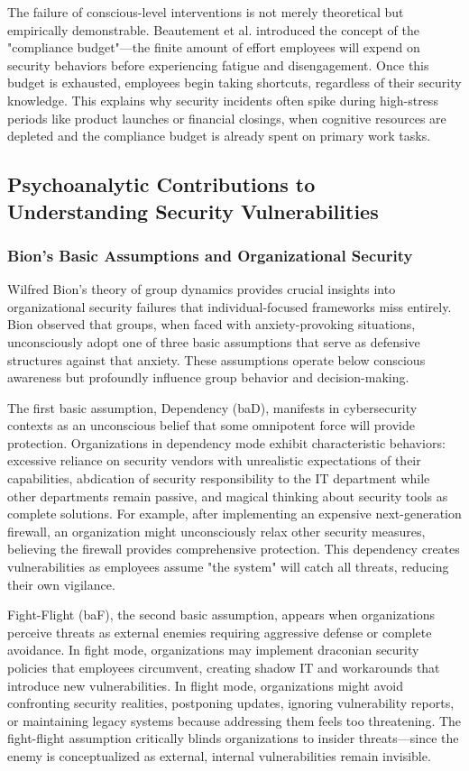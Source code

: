 \documentclass[manuscript,screen,review]{acmart}
\begin{document}
The failure of conscious-level interventions is not merely theoretical but empirically demonstrable. Beautement et al.\cite{beautement2008} introduced the concept of the "compliance budget"—the finite amount of effort employees will expend on security behaviors before experiencing fatigue and disengagement. Once this budget is exhausted, employees begin taking shortcuts, regardless of their security knowledge. This explains why security incidents often spike during high-stress periods like product launches or financial closings, when cognitive resources are depleted and the compliance budget is already spent on primary work tasks.

\subsection{Psychoanalytic Contributions to Understanding Security Vulnerabilities}

\subsubsection{Bion's Basic Assumptions and Organizational Security}

Wilfred Bion's theory of group dynamics\cite{bion1961} provides crucial insights into organizational security failures that individual-focused frameworks miss entirely. Bion observed that groups, when faced with anxiety-provoking situations, unconsciously adopt one of three basic assumptions that serve as defensive structures against that anxiety. These assumptions operate below conscious awareness but profoundly influence group behavior and decision-making.

The first basic assumption, Dependency (baD), manifests in cybersecurity contexts as an unconscious belief that some omnipotent force will provide protection. Organizations in dependency mode exhibit characteristic behaviors: excessive reliance on security vendors with unrealistic expectations of their capabilities, abdication of security responsibility to the IT department while other departments remain passive, and magical thinking about security tools as complete solutions. For example, after implementing an expensive next-generation firewall, an organization might unconsciously relax other security measures, believing the firewall provides comprehensive protection. This dependency creates vulnerabilities as employees assume "the system" will catch all threats, reducing their own vigilance.

Fight-Flight (baF), the second basic assumption, appears when organizations perceive threats as external enemies requiring aggressive defense or complete avoidance. In fight mode, organizations may implement draconian security policies that employees circumvent, creating shadow IT and workarounds that introduce new vulnerabilities. In flight mode, organizations might avoid confronting security realities, postponing updates, ignoring vulnerability reports, or maintaining legacy systems because addressing them feels too threatening. The fight-flight assumption critically blinds organizations to insider threats—since the enemy is conceptualized as external, internal vulnerabilities remain invisible.
\end{document}
